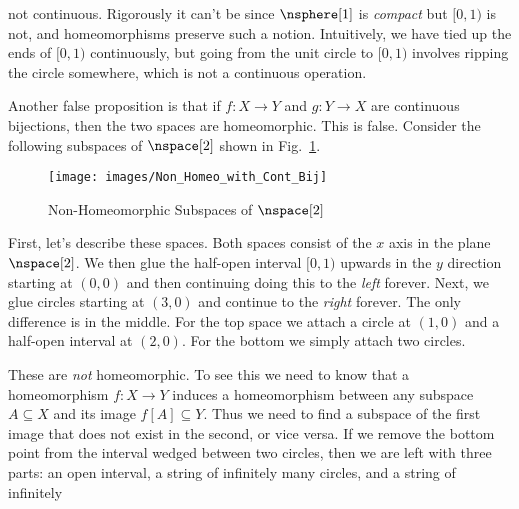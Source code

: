 \documentclass{book}                                                           %
\begin{document}
                not continuous. Rigorously it can't be since $\nsphere[1]$ is
                \textit{compact} but $[0,1)$ is not, and homeomorphisms preserve
                such a notion. Intuitively, we have tied up the ends of $[0,1)$
                continuously, but going from the unit circle to $[0,1)$ involves
                ripping the circle somewhere, which is not a continuous
                operation.
                \par\hfill\par
                Another false proposition is that if $f:X\rightarrow{Y}$ and
                $g:Y\rightarrow{X}$ are continuous bijections, then the two
                spaces are homeomorphic. This is false. Consider the following
                subspaces of $\nspace[2]$ shown in
                Fig.~\ref{fig:Non_Homeomorphic_Subspace}.
                \begin{figure}[H]
                    \centering
                    \captionsetup{type=figure}
                    \texttt{[image: images/Non\_Homeo\_with\_Cont\_Bij]}
                    \caption{Non-Homeomorphic Subspaces of $\nspace[2]$}
                    \label{fig:Non_Homeomorphic_Subspace}
                \end{figure}
                First, let's describe these spaces. Both spaces consist of the
                $x$ axis in the plane $\nspace[2]$. We then glue the half-open
                interval $[0,1)$ upwards in the $y$ direction starting at
                $(0,0)$ and then continuing doing this to the \textit{left}
                forever. Next, we glue circles starting at $(3,0)$ and continue
                to the \textit{right} forever. The only difference is in the
                middle. For the top space we attach a circle at $(1,0)$ and a
                half-open interval at $(2,0)$. For the bottom we simply attach
                two circles.
                \par\hfill\par
                These are \textit{not} homeomorphic. To see this we need to know
                that a homeomorphism $f:X\rightarrow{Y}$ induces a
                homeomorphism between any subspace $A\subseteq{X}$ and its image
                $f[A]\subseteq{Y}$. Thus we need to find a subspace of the first
                image that does not exist in the second, or vice versa. If we
                remove the bottom point from the interval wedged between two
                circles, then we are left with three parts: an open interval,
                a string of infinitely many circles, and a string of infinitely
\end{document}

